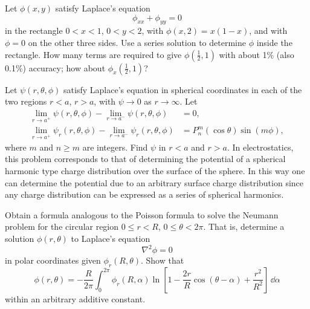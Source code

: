 {%
\begin{Exercise}
  \label{exercise laplace 1 percent}
  Let $\phi(x,y)$ satisfy Laplace's equation
  \[
  \phi_{xx} + \phi_{yy} = 0    
  \]
  in the rectangle $0 < x < 1$, $0 < y < 2$, with $\phi(x,2) = x(1-x)$, and
  with $\phi = 0$ on the other three sides. Use a series solution to determine
  $\phi$ inside the rectangle. How many terms are required to give
  $\phi(\frac{1}{2},1)$ with about 1\% (also 0.1\%) accuracy; how about
  $\phi_x(\frac{1}{2},1)$?

\end{Exercise}








\begin{Exercise}
  \label{exercise laplace spherical two regions}
  Let $\psi(r,\theta,\phi)$ satisfy
  Laplace's equation in spherical coordinates in each of the two regions
  $r < a$, $r > a$, with $ \psi \to 0$ as $ r \to \infty$. Let
  \begin{align*}
    \lim_{r\to a^+} \psi (r,\theta,\phi) - \lim_{r\to a^-} \psi (r,\theta,\phi) 
    &= 0,\\
    \lim_{r\to a^+} \psi_r (r,\theta,\phi) - 
    \lim_{r\to a^-} \psi_r (r,\theta,\phi) &= P_n^m (\cos \theta) 
    \sin(m \phi),
  \end{align*}
  where $m$ and $n \geq m$ are integers. Find $\psi$ in $r < a$ and $r > a$. In
  electrostatics, this problem corresponds to that of determining the potential
  of a spherical harmonic 
  type charge distribution over the surface of the sphere.
  In this way one can determine the potential due to an arbitrary surface
  charge distribution since any charge distribution can be expressed as a series
  of spherical harmonics.

\end{Exercise}








\begin{Exercise}
  \label{exercise poisson formula neumann}
  Obtain a formula analogous to the Poisson formula
  to solve the Neumann problem for the circular region $0 \leq r < R$,
  $0 \leq \theta < 2\pi$. That is, determine a solution 
  $\phi(r,\theta)$ to Laplace's  equation
  \[
  \nabla^2 \phi  = 0
  \]
  in polar coordinates given $\phi_r(R,\theta)$. Show that
  \[
  \phi (r,\theta) = - \frac{R}{2 \pi} \int_0^{2\pi}
  \phi_r(R,\alpha)\ln\left[ 1 - \frac{2r}{R}\cos(\theta -\alpha) + 
    \frac{r^2}{R^2}\right] \,\dd \alpha
  \]
  within an arbitrary additive constant.


\end{Exercise}}
